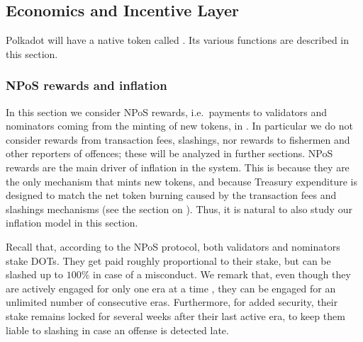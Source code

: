 \subsection{Economics and Incentive Layer}\label{sec:economics}

Polkadot will have a native token called . Its various functions are described in this section.



\subsubsection{NPoS rewards and inflation}

In this section we consider NPoS rewards, i.e.~payments to validators and nominators coming from the minting of new tokens, 
in . In particular we do not consider rewards from transaction fees, slashings, nor rewards to fishermen 
and other reporters of offences; these will be analyzed in further sections. 
NPoS rewards are the main driver of inflation in the system. 
This is because they are the only mechanism that mints new tokens, and because Treasury expenditure is designed to match 
the net token burning caused by the transaction fees and slashings mechanisms (see the section on ). 
Thus, it is natural to also study our inflation model in this section.

Recall that, according to the NPoS protocol, both validators and nominators stake DOTs. 
They get paid roughly proportional to their stake, but can be slashed up to $100\%$ in case of a misconduct. 
We remark that, even though they are actively engaged for only one era at a time , 
they can be engaged for an unlimited number of consecutive eras. 
Furthermore, for added security, their stake remains locked for several weeks after their last active era, 
to keep them liable to slashing in case an offense is detected late.


